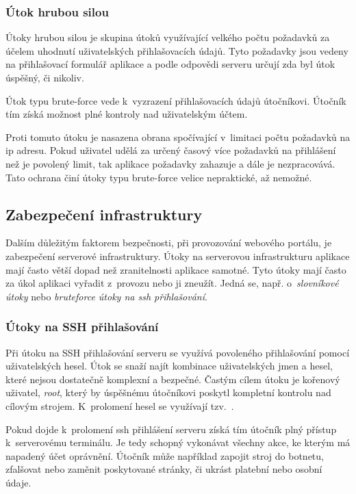 \subsubsection{Útok hrubou silou}

Útoky hrubou silou\cite{bruteforce} je skupina útoků využívající velkého počtu požadavků za účelem uhodnutí uživatelských přihlašovacích údajů. Tyto požadavky jsou vedeny na přihlašovací formulář aplikace a podle odpovědi serveru určují zda byl útok úspěšný, či nikoliv.

Útok typu brute-force vede k~vyzrazení přihlašovacích údajů útočníkovi. Útočník tím získá možnost plné kontroly nad uživatelským účtem.

Proti tomuto útoku je nasazena obrana spočívající v~limitaci počtu požadavků na \acrshort{ip} adresu. Pokud uživatel udělá za určený časový více požadavků na přihlášení než je povolený limit, tak aplikace požadavky zahazuje a dále je nezpracovává. Tato ochrana činí útoky typu brute-force velice nepraktické, až nemožné.

\subsection{Zabezpečení infrastruktury}

Dalším důležitým faktorem bezpečnosti, při provozování webového portálu, je zabezpečení serverové infrastruktury.
Útoky na serverovou infrastrukturu aplikace mají často větší dopad než zranitelnosti aplikace samotné.
Tyto útoky mají často za úkol aplikaci vyřadit z~provozu nebo ji zneužít.
Jedná se, např. o~\emph{slovníkové útoky} nebo \emph{bruteforce útoky na \acrshort{ssh} přihlašování}.

\subsubsection{Útoky na SSH přihlašování}

Při útoku na SSH přihlašování serveru se využívá povoleného přihlašování pomocí uživatelských hesel.
Útok se snaží najít kombinace uživatelských jmen a hesel, které nejsou dostatečně komplexní a bezpečné.
Častým cílem útoku je kořenový uživatel, \emph{root}, který by úspěšnému útočníkovi poskytl kompletní kontrolu nad cílovým strojem.
K~prolomení hesel se využívají tzv.\ .

Pokud dojde k~prolomení \acrshort{ssh} přihlášení serveru získá tím útočník plný přístup k~serverovému terminálu. Je tedy schopný vykonávat všechny akce, ke kterým má napadený účet oprávnění. Útočník může například zapojit stroj do botnetu\cite{botnet}, zfalšovat nebo zaměnit poskytované stránky, či ukrást platební nebo osobní údaje.

